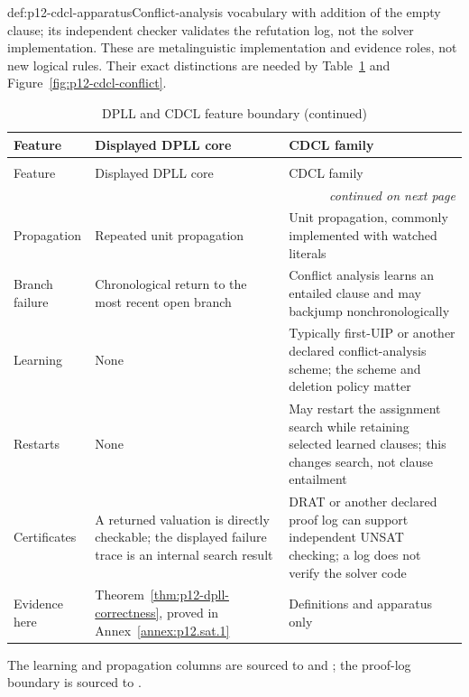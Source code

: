 \begin{hbdefinition}{def:p12-cdcl-apparatus}{Conflict-analysis vocabulary}
with addition of the empty clause; its independent checker validates the
refutation log, not the solver implementation.  These are metalinguistic
implementation and evidence roles, not new logical rules.  Their exact
distinctions are needed by
Table~\ref{tab:p12-dpll-cdcl} and Figure~\ref{fig:p12-cdcl-conflict}.
%
\end{hbdefinition}

\begin{longtable}{@{}p{}p{}p{}@{}}
\caption{DPLL and CDCL feature boundary.}
\label{tab:p12-dpll-cdcl}\\
\toprule
Feature & Displayed DPLL core & CDCL family \\ \midrule
\endfirsthead
\caption[]{DPLL and CDCL feature boundary (continued)}\\
\toprule
Feature & Displayed DPLL core & CDCL family \\ \midrule
\endhead
\midrule\multicolumn{3}{r}{\emph{continued on next page}}\\
\endfoot
\endlastfoot
Propagation & Repeated unit propagation & Unit propagation, commonly
implemented with watched literals \\ \addlinespace
Branch failure & Chronological return to the most recent open branch &
Conflict analysis learns an entailed clause and may backjump
nonchronologically \\ \addlinespace
Learning & None & Typically first-UIP or another declared conflict-analysis
scheme; the scheme and deletion policy matter \\ \addlinespace
Restarts & None & May restart the assignment search while retaining selected
learned clauses; this changes search, not clause entailment \\ \addlinespace
Certificates & A returned valuation is directly checkable; the displayed
failure trace is an internal search result & DRAT or another declared proof log
can support independent UNSAT checking; a log does not verify the solver code \\
\addlinespace
Evidence here & Theorem~\ref{thm:p12-dpll-correctness}, proved in
Annex~\ref{annex:p12.sat.1} & Definitions and apparatus only \\
\bottomrule
\end{longtable}
The learning and propagation columns are sourced to
\cite{MarquesSilvaSakallah1999,MoskewiczEtAl2001} and
\cite{EenSorensson2003,MarquesSilvaLynceMalik2009}; the proof-log boundary is
sourced to \cite{WetzlerHeuleHunt2014}.

